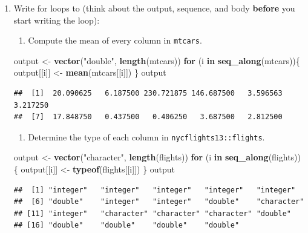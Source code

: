 \documentclass[]{book}
\newenvironment{Shaded}{\begin{snugshade}}{\end{snugshade}}
\newcommand{\ControlFlowTok}[1]{\textcolor[rgb]{0.13,0.29,0.53}{\textbf{#1}}}
\newcommand{\KeywordTok}[1]{\textcolor[rgb]{0.13,0.29,0.53}{\textbf{#1}}}
\newcommand{\NormalTok}[1]{#1}
\newcommand{\StringTok}[1]{\textcolor[rgb]{0.31,0.60,0.02}{#1}}
\providecommand{\tightlist}{%
  \setlength{\itemsep}{0pt}\setlength{\parskip}{0pt}}
\theoremstyle{definition}
\theoremstyle{definition}
\theoremstyle{definition}
\theoremstyle{remark}
\begin{document}
\begin{enumerate}
\def\labelenumi{\arabic{enumi}.}
\item
  Write for loops to (think about the output, sequence, and body
  \textbf{before} you start writing the loop):

  \begin{enumerate}
  \def\labelenumii{\arabic{enumii}.}
  \tightlist
  \item
    Compute the mean of every column in \texttt{mtcars}.
  \end{enumerate}

\begin{Shaded}
\begin{Highlighting}[]
\NormalTok{output <-}\StringTok{ }\KeywordTok{vector}\NormalTok{(}\StringTok{"double"}\NormalTok{, }\KeywordTok{length}\NormalTok{(mtcars))}
\ControlFlowTok{for}\NormalTok{ (i }\ControlFlowTok{in} \KeywordTok{seq_along}\NormalTok{(mtcars))\{}
\NormalTok{  output[[i]] <-}\StringTok{ }\KeywordTok{mean}\NormalTok{(mtcars[[i]])}
\NormalTok{\}}
\NormalTok{output}
\end{Highlighting}
\end{Shaded}

\begin{verbatim}
##  [1]  20.090625   6.187500 230.721875 146.687500   3.596563   3.217250
##  [7]  17.848750   0.437500   0.406250   3.687500   2.812500
\end{verbatim}

  \begin{enumerate}
  \def\labelenumii{\arabic{enumii}.}
  \tightlist
  \item
    Determine the type of each column in \texttt{nycflights13::flights}.
  \end{enumerate}

\begin{Shaded}
\begin{Highlighting}[]
\NormalTok{output <-}\StringTok{ }\KeywordTok{vector}\NormalTok{(}\StringTok{"character"}\NormalTok{, }\KeywordTok{length}\NormalTok{(flights))}
\ControlFlowTok{for}\NormalTok{ (i }\ControlFlowTok{in} \KeywordTok{seq_along}\NormalTok{(flights))\{}
\NormalTok{  output[[i]] <-}\StringTok{ }\KeywordTok{typeof}\NormalTok{(flights[[i]])}
\NormalTok{\}}
\NormalTok{output}
\end{Highlighting}
\end{Shaded}

\begin{verbatim}
##  [1] "integer"   "integer"   "integer"   "integer"   "integer"  
##  [6] "double"    "integer"   "integer"   "double"    "character"
## [11] "integer"   "character" "character" "character" "double"   
## [16] "double"    "double"    "double"    "double"
\end{verbatim}


\end{enumerate}
\end{document}
